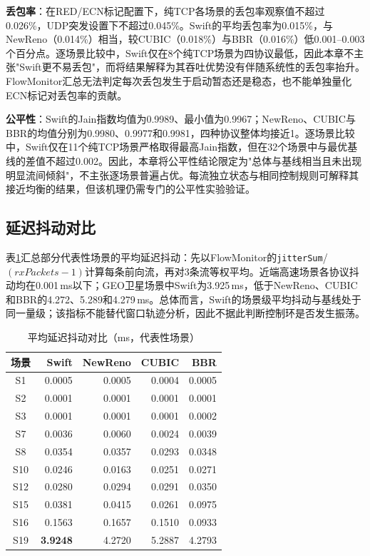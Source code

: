 \textbf{丢包率}：在RED/ECN标记配置下，纯TCP各场景的丢包率观察值不超过0.026\%，UDP突发设置下不超过0.045\%。Swift的平均丢包率为0.015\%，与NewReno（0.014\%）相当，较CUBIC（0.018\%）与BBR（0.016\%）低0.001--0.003个百分点。逐场景比较中，Swift仅在8个纯TCP场景为四协议最低，因此本章不主张"Swift更不易丢包"，而将结果解释为其吞吐优势没有伴随系统性的丢包率抬升。FlowMonitor汇总无法判定每次丢包发生于启动暂态还是稳态，也不能单独量化ECN标记对丢包率的贡献。

\textbf{公平性}：Swift的Jain指数均值为0.9989、最小值为0.9967；NewReno、CUBIC与BBR的均值分别为0.9980、0.9977和0.9981，四种协议整体均接近1。逐场景比较中，Swift仅在11个纯TCP场景严格取得最高Jain指数，但在32个场景中与最优基线的差值不超过0.002。因此，本章将公平性结论限定为"总体与基线相当且未出现明显流间倾斜"，不主张逐场景普遍占优。每流独立状态与相同控制规则可解释其接近均衡的结果，但该机理仍需专门的公平性实验验证。

\subsection{延迟抖动对比}

表\ref{tab:jitter_summary}汇总部分代表性场景的平均延迟抖动：先以FlowMonitor的\texttt{jitterSum}/$(rxPackets-1)$计算每条前向流，再对3条流等权平均。近端高速场景各协议抖动均在0.001\,ms以下；GEO卫星场景中Swift为3.925\,ms，低于NewReno、CUBIC和BBR的4.272、5.289和4.279\,ms。总体而言，Swift的场景级平均抖动与基线处于同一量级；该指标不能替代窗口轨迹分析，因此不据此判断控制环是否发生振荡。

\begin{table}[htbp]
\centering
\caption{平均延迟抖动对比（ms，代表性场景）}
\label{tab:jitter_summary}
\small
\begin{tabular}{|c|r|r|r|r|}
\hline
\textbf{场景} & \textbf{Swift} & \textbf{NewReno} & \textbf{CUBIC} & \textbf{BBR} \\
\hline
S1 & 0.0005 & 0.0005 & 0.0004 & 0.0005 \\
S2 & 0.0001 & 0.0001 & 0.0001 & 0.0001 \\
S3 & 0.0001 & 0.0001 & 0.0001 & 0.0002 \\
S7 & 0.0036 & 0.0060 & 0.0024 & 0.0039 \\
S8 & 0.0354 & 0.0357 & 0.0293 & 0.0348 \\
S10 & 0.0246 & 0.0163 & 0.0251 & 0.0271 \\
S12 & 0.0280 & 0.0294 & 0.0291 & 0.0350 \\
S15 & 0.0381 & 0.0415 & 0.0261 & 0.0975 \\
S16 & 0.1563 & 0.1657 & 0.1510 & 0.0933 \\
S19 & \textbf{3.9248} & 4.2720 & 5.2887 & 4.2793 \\
\hline
\end{tabular}
\end{table}


